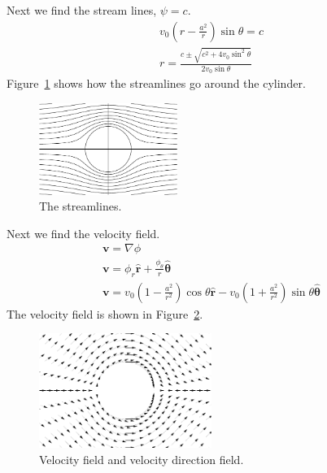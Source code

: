 \begin{Example}
  Next we find the stream lines, $\psi = c$.
  \begin{gather*}
    v_0 \left( r - \frac{a^2}{r} \right) \sin \theta = c
    \\
    r = \frac{ c \pm \sqrt{c^2 + 4 v_0 \sin^2 \theta} }{ 2 v_0 \sin \theta }
  \end{gather*}
  Figure~\ref{figure streamlines-v0za2z} shows how the streamlines go around
  the cylinder.
  \begin{figure}[htb!]
    \begin{center}
      \includegraphics[width=0.4\textwidth]{fcv/analytic/streamlines-v0za2z}
    \end{center}
    \caption{The streamlines.}
    \label{figure streamlines-v0za2z}
  \end{figure}
  Next we find the velocity field.
  \begin{gather*}
    \mathbf{v} = \nabla \phi
    \\
    \mathbf{v} = \phi_r \hat{\mathbf{r}} + \frac{\phi_\theta}{r} \hat{\boldsymbol{\theta}}
    \\
    \mathbf{v} = v_0 \left(1 - \frac{a^2}{r^2} \right) \cos \theta \hat{\mathbf{r}} 
    - v_0 \left(1 + \frac{a^2}{r^2} \right) \sin \theta \hat{\boldsymbol{\theta}}
  \end{gather*}
  The velocity field is shown in
  Figure~\ref{figure velocity-field-v0za2z}.
  \begin{figure}[htb!]
    \begin{center}
      \includegraphics[width=0.5\textwidth]{fcv/analytic/velocity-field-v0za2z}
    \end{center}
    \caption{Velocity field and velocity direction field.}
    \label{figure velocity-field-v0za2z}
  \end{figure}
\end{Example}













